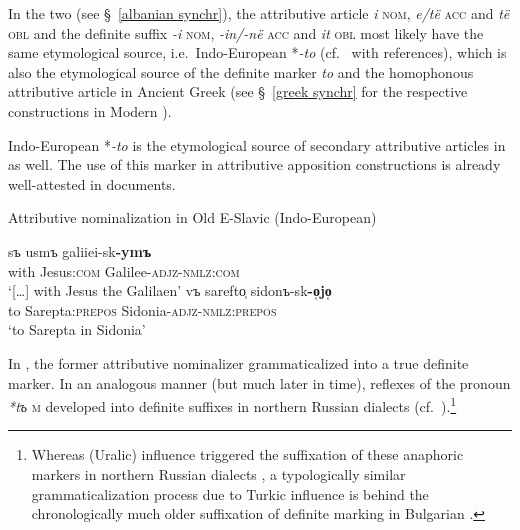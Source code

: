 {In the two  (see \S~\ref{albanian synchr}), the attributive article \textit{i} \textsc{nom}, \textit{e/të} \textsc{acc} and \textit{të} \textsc{obl} and the definite suffix \textit{-i} \textsc{nom}, \textit{-in/-në} \textsc{acc} and \textit{it} \textsc{obl} most likely have the same etymological source, i.e.~Indo-European *\textit{-to} (cf.~\citet[165]{himmelmann1997} with references), which is also the etymological source of the definite marker \textit{to} and the homophonous attributive article in Ancient Greek (see \S~\ref{greek synchr} for the respective constructions in Modern ).

Indo-European *\textit{-to} is the etymological source of secondary attributive articles in  as well. The use of this marker in attributive apposition constructions is already well-attested in  documents.
\begin{exe}
\ex \rm{Attributive nominalization in Old E-Slavic (Indo-European)}
\begin{xlist}
\ex
\gll	[\dots] sъ usmъ galiiei-sk\textbf{-ymъ}\\
	{ } with Jesus:\textsc{com} Galilee-\textsc{adjz}-\textsc{nmlz:com}\\
\glt 	‘[\dots] with Jesus the Galilaen’ \citep[Matthew 26, cit.][214]{mendoza2004}
\ex 
\gll	vъ sarefto̜ sidonъ-sk\textbf{-o̜jo̜}\\
	to Sarepta:\textsc{prepos} Sidonia-\textsc{adjz}-\textsc{nmlz:prepos}\\
\glt 	‘to Sarepta in Sidonia’ \citep[Luke 4, cit.][214]{mendoza2004}
\end{xlist}
\end{exe}
In , the former attributive nominalizer grammaticalized into a true definite marker. In an analogous manner (but much later in time), reflexes of the  pronoun \textit{*tъ} \textsc{m} developed into definite suffixes in northern Russian dialects (cf.~\citealt
{leinonen2006a}).\footnote{Whereas  (Uralic) influence triggered the suffixation of these anaphoric markers in northern Russian dialects \citep
{leinonen2006a}, a typologically similar grammaticalization process due to Turkic influence is behind the chronologically much older suffixation of definite marking in Bulgarian \citep[114–122]{kusmenko2008}.}

}
